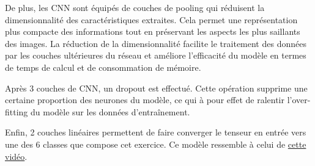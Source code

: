 De plus, les CNN sont équipés de couches de pooling qui réduisent la dimensionnalité des caractéristiques extraites. Cela permet une représentation plus compacte des informations tout en préservant les aspects les plus saillants des images. La réduction de la dimensionnalité facilite le traitement des données par les couches ultérieures du réseau et améliore l'efficacité du modèle en termes de temps de calcul et de consommation de mémoire.


Après 3 couches de CNN, un \og dropout \fg{} est effectué. Cette opération supprime une certaine proportion des neurones du modèle, ce qui à pour effet de ralentir l'over-fitting du modèle sur les données d'entraînement.


Enfin, 2 couches linéaires permettent de faire converger le tenseur en entrée vers une des 6 classes que compose cet exercice. Ce modèle ressemble à celui de \href{https://www.youtube.com/watch?v=f0t-OCG79-U}{cette vidéo}.


